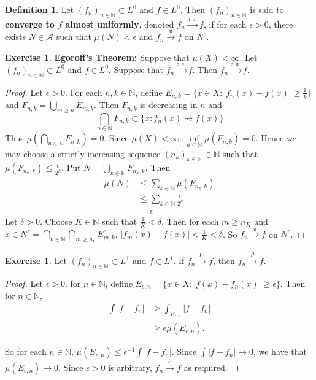 \documentclass[12pt]{amsart}
\theoremstyle{definition}
\newtheorem{defn}[definition]{Definition}
\newtheorem{ex}[definition]{Exercise}
\newcommand{\del}{\delta}
\newcommand{\ep}{\epsilon}
\newcommand{\N}{\mathbb{N}}
\newcommand{\MA}{\mathcal{A}}
\newcommand{\convt}[1]{\xrightarrow{\text{#1}}}
\newcommand{\conv}[1]{\xrightarrow{#1}}
\newcommand{\lex}[1]{\label{ex:#1}}
\newcommand{\ld}[1]{\label{defn:#1}}
\begin{document}
	\begin{defn} \ld{35004} 
		 Let $(f_n)_{n \in \N} \subset L^0$ and $f \in L^0$. Then $(f_n)_{n \in \N}$ is said to \textbf{converge to $f$ almost uniformly}, denoted $f_n \xrightarrow{\text{a.u.}} f$, if for each $\ep >0$, there exists $N \in \MA$ such that $\mu(N) < \ep$ and $f_n \convt{u} f$ on $N^c$. 
	\end{defn}	
	
	\begin{ex} \lex{35005} \textbf{Egoroff's Theorem:}
		Suppose that $\mu(X) < \infty$. Let $(f_n)_{n \in \N} \subset L^0$ and $f \in L^0$. Suppose that $f_n \convt{a.e.} f$. Then $f_n \convt{a.u.} f$.
	\end{ex}
	
	\begin{proof}
		Let $\ep >0$. For each $n, k \in \N$, define $E_{n, k} = \{x \in X: \vert f_n(x) - f(x) \vert \geq \frac{1}{k} \}$ and $F_{n,k} = \bigcup\limits_{m \geq n}E_{m,k}$. Then $F_{n,k}$ is decreasing in $n$ and $$\bigcap\limits_{n \in \N}F_{n,k} \subset \{x: f_n(x) \not \rightarrow f(x)\}$$ 
		Thus $\mu(\bigcap\limits_{n \in \N}F_{n,k}) = 0$. Since $\mu(X) < \infty$, $\inf\limits_{n \in \N}\mu(F_{n,k}) = 0$. Hence we may choose a strictly increasing sequence $(n_k)_{k \in \N} \subset \N$ such that  $\mu(F_{n_k,k}) \leq \frac{\ep}{2^{k}}$. Put $N = \bigcup\limits_{k \in \N}F_{n_k,k}$. Then 
		\begin{align*}
			\mu(N) 
			&\leq \sum\limits_{k \in \N}\mu(F_{n_k,k}) \\
			& \leq \sum\limits_{k \in \N} \frac{\ep}{2^k}\\
			& = \ep
		\end{align*} 
		Let $\del > 0$. Choose $K \in \N$ such that $\frac{1}{K} < \del$. Then for each $m \geq n_K$ and $x \in N^c =\bigcap\limits_{k \in \N}\bigcap\limits_{m \geq n_k}E_{m,k}^c$, $|f_m(x)- f(x)| < \frac{1}{K} < \del$. So $f_n \convt{u} f$ on $N^c$. 
	\end{proof}
	
	\begin{ex} \lex{35006} 
		Let $(f_n)_{n \in \N} \subset L^1$ and $f \in L^1$. If $f_n \xrightarrow{L^1}f$, then $f_n \conv{\mu} f$.
	\end{ex}
	
	\begin{proof}
		Let $\ep >0$. for $n \in \N$, define $E_{e,n} = \{x \in X: |f(x) - f_n(x)|\geq \ep\}$. Then for $n \in \N$,
		\begin{align*}
			\int |f - f_n|
			& \geq \int_{E_{\ep,n}} |f- f_n|\\
			& \geq \ep \mu(E_{\ep,n}).
		\end{align*}
		
		So for each $n \in \N$, $\mu(E_{\ep, n}) \leq \ep^{-1}\int |f - f_n|$. Since $\int |f - f_n| \conv{} 0$, we have that $\mu(E_{\ep,n}) \conv{} 0$. Since $\ep >0$ is arbitrary, $f_n \conv{\mu} f$ as required. 
	\end{proof}
	
\end{document}
